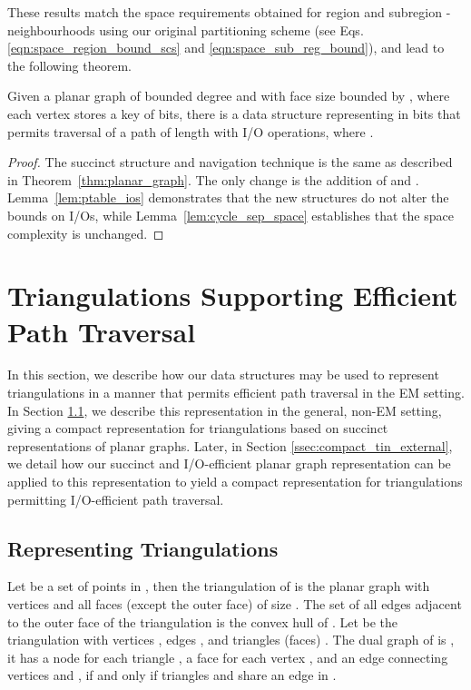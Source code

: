 These results match the space requirements obtained for region and
subregion -neighbourhoods using our original partitioning
scheme (see Eqs. \ref{eqn:space_region_bound_scs} and
\ref{eqn:space_sub_reg_bound}), and lead to the following theorem.

\begin{theorem}
  Given a planar graph  of bounded degree and with face size
  bounded by , where each vertex stores a key of  bits, there is
  a data structure representing  in  bits that
  permits traversal of a path of length  with  I/O operations, where .
\end{theorem}

\begin{proof}
The succinct structure and navigation technique is the same as
described in Theorem~\ref{thm:planar_graph}.
The only change is the addition of  and .
Lemma~\ref{lem:ptable_ios} demonstrates that the new structures do not alter the
bounds on I/Os, while Lemma~\ref{lem:cycle_sep_space} establishes that the 
space complexity is unchanged.
\end{proof}

\section{Triangulations Supporting Efficient Path Traversal}
\label{sec:tins}


In this section, we describe how our data structures may be used to 
represent triangulations in a manner that permits efficient path
traversal in the EM setting.
In Section \ref{ssec:triangulation_rep}, we describe this representation in the 
general, non-EM setting, giving a compact representation for triangulations 
based on succinct representations of planar graphs.
Later, in Section \ref{ssec:compact_tin_external}, we detail how our succinct
and I/O-efficient planar graph representation can be applied to this representation 
to yield a compact representation for 
triangulations permitting I/O-efficient path traversal.

\subsection{Representing Triangulations}
\label{ssec:triangulation_rep}


Let  be a set of points in , then the triangulation 
of  is the planar graph with  vertices and all faces 
(except the outer face) of size .
The set of all edges adjacent to the outer face of the triangulation is the
convex hull of . 
Let  be the triangulation with vertices , 
edges , and 
triangles (faces) . 
The dual graph of  is , it has a node
  for each triangle , a face  for each 
vertex , and an edge  connecting vertices  and
 , if and only if triangles  and  share an edge in .

